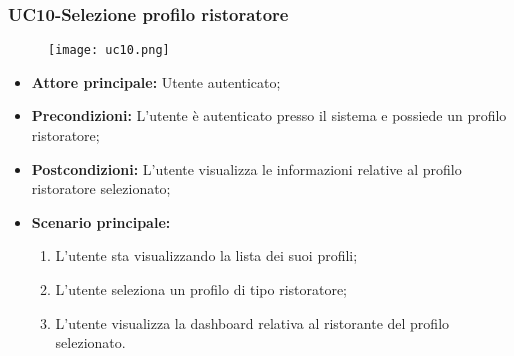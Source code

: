 \pagebreak
\subsubsection{UC10-Selezione profilo ristoratore}
\begin{figure}[h] \texttt{[image: uc10.png]} \end{figure}
\begin{itemize}
\item \textbf{Attore principale:} Utente autenticato;
\item \textbf{Precondizioni:} L'utente è autenticato presso il sistema e possiede un profilo ristoratore;
\item \textbf{Postcondizioni:} L'utente visualizza le informazioni relative al profilo ristoratore selezionato;
\item \textbf{Scenario principale:}
\begin{enumerate}
    \item L'utente sta visualizzando la lista dei suoi profili;
    \item L'utente seleziona un profilo di tipo ristoratore;
    \item L'utente visualizza la dashboard relativa al ristorante del profilo selezionato.
\end{enumerate}
\end{itemize}

